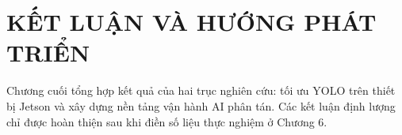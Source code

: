 \chapter{KẾT LUẬN VÀ HƯỚNG PHÁT TRIỂN}

Chương cuối tổng hợp kết quả của hai trục nghiên cứu: tối ưu YOLO trên thiết bị
Jetson và xây dựng nền tảng vận hành AI phân tán. Các kết luận định lượng chỉ
được hoàn thiện sau khi điền số liệu thực nghiệm ở Chương 6.



